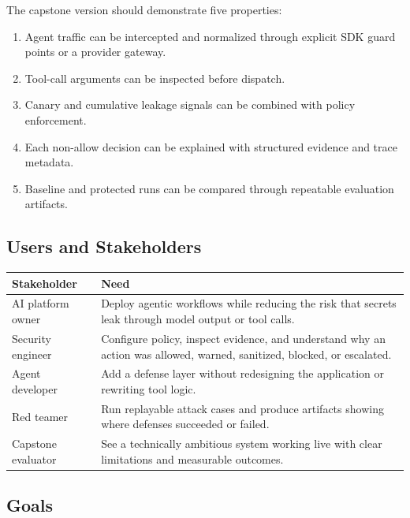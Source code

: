 \documentclass[11pt,letterpaper]{article}
\begin{document}
The capstone version should demonstrate five properties:

\begin{enumerate}
    \item Agent traffic can be intercepted and normalized through explicit SDK guard points or a provider gateway.
    \item Tool-call arguments can be inspected before dispatch.
    \item Canary and cumulative leakage signals can be combined with policy enforcement.
    \item Each non-allow decision can be explained with structured evidence and trace metadata.
    \item Baseline and protected runs can be compared through repeatable evaluation artifacts.
\end{enumerate}

\subsection{Users and Stakeholders}

\begin{longtable}{p{}p{}}
\toprule
\textbf{Stakeholder} & \textbf{Need} \\
\midrule
AI platform owner & Deploy agentic workflows while reducing the risk that secrets leak through model output or tool calls. \\
Security engineer & Configure policy, inspect evidence, and understand why an action was allowed, warned, sanitized, blocked, or escalated. \\
Agent developer & Add a defense layer without redesigning the application or rewriting tool logic. \\
Red teamer & Run replayable attack cases and produce artifacts showing where defenses succeeded or failed. \\
Capstone evaluator & See a technically ambitious system working live with clear limitations and measurable outcomes. \\
\bottomrule
\end{longtable}

\subsection{Goals}
\end{document}
